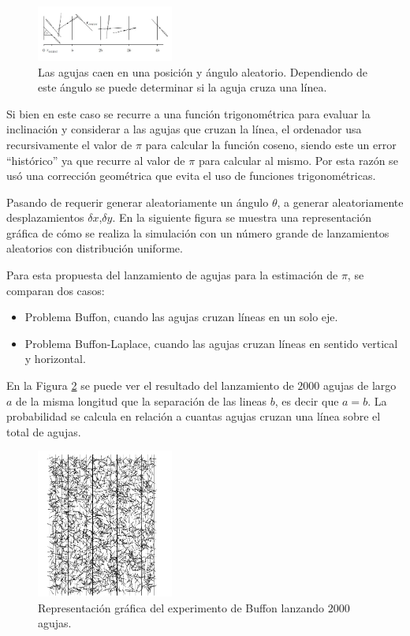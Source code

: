 \documentclass{rbf}
\begin{document}
\begin{figure}[tbp!]
 \centering
  \includegraphics[width=0.4\textwidth]{figures/agujas.jpg}
	\caption{Las agujas caen en una posición y ángulo aleatorio. Dependiendo de este ángulo se puede determinar si la aguja cruza una línea.\cite{krauth}}
 \label{aguja}
\end{figure}

Si bien en este caso se recurre a una función trigonométrica para evaluar la inclinación y considerar a las agujas que cruzan la línea, el ordenador usa recursivamente el valor de $\pi$ para calcular la función coseno, siendo este un error “histórico” ya que recurre al valor de $\pi$ para calcular al mismo. Por esta razón se usó una corrección geométrica que evita el uso de funciones trigonométricas.

Pasando de requerir generar aleatoriamente un ángulo $\theta$, a generar aleatoriamente desplazamientos $\delta x$,$\delta y$. En la siguiente figura se muestra una representación gráfica de cómo se realiza la simulación con un número grande de lanzamientos aleatorios con distribución uniforme. \cite{krauth}

Para esta propuesta del lanzamiento de agujas para la estimación de $\pi$, se comparan dos casos:

\begin{itemize}
    \item Problema Buffon, cuando las agujas cruzan líneas en un solo eje.
    \item Problema Buffon-Laplace, cuando las agujas cruzan líneas en sentido vertical y horizontal.
\end{itemize}



En la Figura \ref{buff} se puede ver el resultado del lanzamiento de $2000$ agujas de largo $a$ de la misma longitud que la separación de las lineas $b$, es decir que $a=b$. La probabilidad se calcula en relación a cuantas agujas cruzan una línea sobre el total de agujas. 

\begin{figure}[tbp!]
 \centering
  \includegraphics[width=0.4\textwidth]{figures/buffon.jpg}
    \caption{Representación gráfica del experimento de Buffon lanzando $2000$ agujas.\cite{krauth}}
 \label{buff}
\end{figure}
\end{document}
